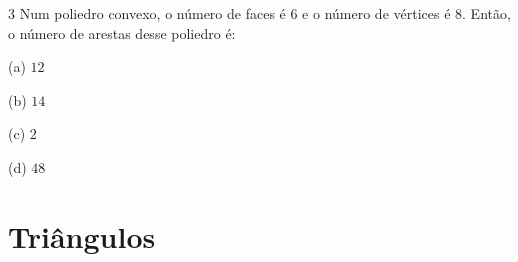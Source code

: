 
\num{3}  Num poliedro convexo, o número de faces é $6$ e o número de vértices é
$8$. Então, o número de arestas desse poliedro é:

(a) $12$

(b) $14$

(c) $2$

(d) $48$



\chapter{Triângulos}

